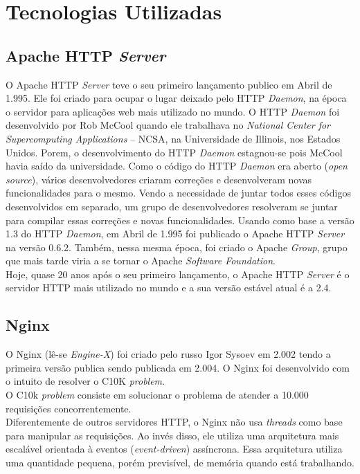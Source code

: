 \chapter{Tecnologias Utilizadas}\label{tecnologias_utilizadas}


\section{Apache HTTP \textit{Server}}
O Apache HTTP \textit{Server} teve o seu primeiro lançamento publico em Abril de 1.995. Ele foi criado para ocupar o lugar deixado pelo HTTP \textit{Daemon}, na época o servidor para aplicações web mais utilizado no mundo. O HTTP \textit{Daemon} foi desenvolvido por Rob McCool quando ele trabalhava no \textit{National Center for Supercomputing Applications} – NCSA, na Universidade de Illinois, nos Estados Unidos. Porem, o desenvolvimento do HTTP \textit{Daemon} estagnou-se pois McCool havia saído da universidade. Como o código do HTTP \textit{Daemon} era aberto (\textit{open source}), vários desenvolvedores criaram correções e desenvolveram novas funcionalidades para o mesmo. Vendo a necessidade de juntar todos esses códigos desenvolvidos em separado, um grupo de desenvolvedores resolveram se juntar para compilar essas correções e novas funcionalidades. Usando como base a versão 1.3 do HTTP \textit{Daemon}, em Abril de 1.995 foi publicado o Apache HTTP \textit{Server} na versão 0.6.2. Também, nessa mesma época, foi criado o Apache \textit{Group}, grupo que mais tarde viria a se tornar o Apache \textit{Software Foundation}.\\
Hoje, quase 20 anos após o seu primeiro lançamento, o Apache HTTP \textit{Server} é o servidor HTTP mais utilizado no mundo e a sua versão estável atual é a 2.4.\\

\section{Nginx}
O Nginx (lê-se \textit{Engine-X}) foi criado pelo russo Igor Sysoev em 2.002 tendo a primeira versão publica sendo publicada em 2.004. O Nginx foi desenvolvido com o intuito de resolver o C10K \textit{problem}.\\
O C10k \textit{problem} consiste em solucionar o problema de atender a 10.000 requisições concorrentemente.\\
Diferentemente de outros servidores HTTP, o Nginx não usa \textit{threads} como base para manipular as requisições. Ao invés disso, ele utiliza uma arquitetura mais escalável orientada à eventos (\textit{event-driven}) assíncrona. Essa arquitetura utiliza uma quantidade pequena, porém previsível, de memória quando está trabalhando.\\

